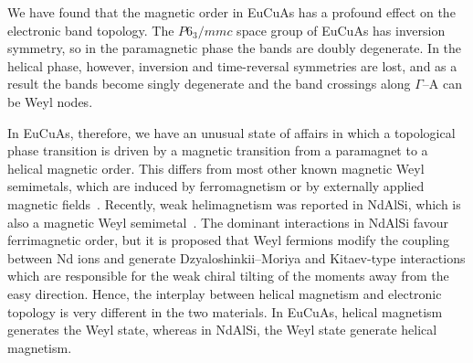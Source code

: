 \documentclass[aps,prl,amsmath,amssymb,amstext,citeautoscript,punctuation,nofootinbib,superscriptaddress,twocolumn]{revtex4-1}
\begin{document}
We have found that the magnetic order in EuCuAs has a profound effect on the electronic band topology. The $P6_3/mmc$ space group of EuCuAs has inversion symmetry, so in the paramagnetic phase the bands are doubly degenerate. In the helical phase, however,  inversion and time-reversal symmetries are lost, and as a result the bands become singly degenerate and the band crossings along $\Gamma$--A can be Weyl nodes. 

In EuCuAs, therefore, we have an unusual state of affairs in which a topological phase transition is driven by a magnetic transition from a paramagnet to a helical magnetic order. This differs from most other known magnetic Weyl semimetals, which are induced by ferromagnetism or by externally applied magnetic fields~\cite{Bernevig_2022_review}. Recently, weak helimagnetism was reported in NdAlSi, which is also a magnetic Weyl semimetal~\cite{Gaudet_2021_NdAlSi}. The dominant interactions in NdAlSi favour ferrimagnetic order, but it is proposed that Weyl fermions modify the coupling between Nd ions and generate Dzyaloshinkii--Moriya and Kitaev-type interactions which are responsible for the weak chiral tilting of the moments away from the easy direction.  Hence, the interplay between helical magnetism and electronic topology is very different in the two materials.  In EuCuAs, helical magnetism generates the Weyl state, whereas in NdAlSi, the Weyl state generate helical magnetism. 
 
\end{document}
